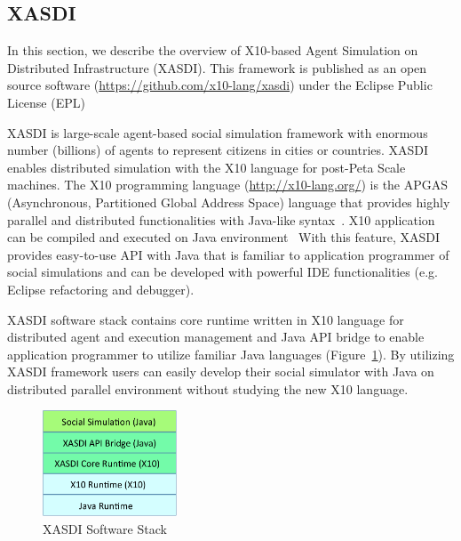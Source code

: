 \subsection{XASDI}
\label{ss:XASDI}

In this section, we describe the overview of X10-based Agent Simulation on Distributed Infrastructure (XASDI).
This framework is published as an open source software (\url{https://github.com/x10-lang/xasdi}) under the Eclipse Public License (EPL)

XASDI is large-scale agent-based social simulation framework with enormous number (billions) of agents to represent citizens in cities or countries.
XASDI enables distributed simulation with the X10 language for post-Peta Scale machines.
The X10 programming language (\url{http://x10-lang.org/}) is the APGAS (Asynchronous, Partitioned Global Address Space) language that provides highly parallel and distributed functionalities with Java-like syntax~\cite{Charles:2005:XOA:1094811.1094852}. X10 application can be compiled and executed on Java environment~\cite{Takeuchi:2011:CXJ:2212736.2212739,Takeuchi:2013:JIM:2481268.2481278}
With this feature, XASDI provides easy-to-use API with Java that is familiar to application programmer of social simulations and can be developed with powerful IDE functionalities (e.g. Eclipse refactoring and debugger).

XASDI software stack contains core runtime written in X10 language for distributed agent and execution management and Java API bridge to enable application programmer to utilize familiar Java languages (Figure~\ref{fig:Figs.mizuta/xasdistack}).
By utilizing XASDI framework users can easily develop their social simulator with Java on distributed parallel environment without studying the new X10 language.

\begin{figure}[h]
  \centering
  \includegraphics[width=4cm]{Figs.mizuta/xasdistack.pdf}
  \caption{XASDI Software Stack}
  \label{fig:Figs.mizuta/xasdistack}
\end{figure}


